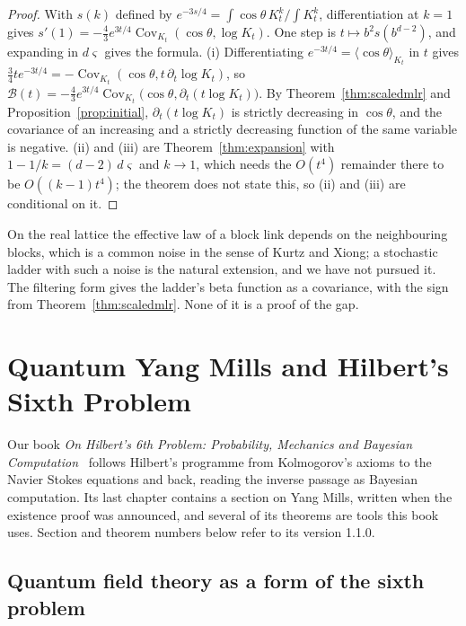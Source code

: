 \begin{proof}
With $s(k)$ defined by $e^{-3s/4}=\int\cos\theta\,K_t^k/\int K_t^k$, differentiation at $k=1$ gives $s'(1)=-\frac43e^{3t/4}\operatorname{Cov}_{K_t}(\cos\theta,\log K_t)$. One step is $t\mapsto b^2s(b^{d-2})$, and expanding in $d\varsigma$ gives the formula. (i) Differentiating $e^{-3t/4}=\langle\cos\theta\rangle_{K_t}$ in $t$ gives $\frac34te^{-3t/4}=-\operatorname{Cov}_{K_t}(\cos\theta,t\,\partial_t\log K_t)$, so $\mathcal B(t)=-\frac43e^{3t/4}\operatorname{Cov}_{K_t}\big(\cos\theta,\partial_t(t\log K_t)\big)$. By Theorem~\ref{thm:scaledmlr} and Proposition~\ref{prop:initial}, $\partial_t(t\log K_t)$ is strictly decreasing in $\cos\theta$, and the covariance of an increasing and a strictly decreasing function of the same variable is negative. (ii) and (iii) are Theorem~\ref{thm:expansion} with $1-1/k=(d-2)\,d\varsigma$ and $k\to1$, which needs the $O(t^4)$ remainder there to be $O((k-1)t^4)$; the theorem does not state this, so (ii) and (iii) are conditional on it.
\end{proof}

On the real lattice the effective law of a block link depends on the neighbouring blocks, which is a common noise in the sense of Kurtz and Xiong; a stochastic ladder with such a noise is the natural extension, and we have not pursued it. The filtering form gives the ladder's beta function as a covariance, with the sign from Theorem~\ref{thm:scaledmlr}. None of it is a proof of the gap.

\section{Quantum Yang Mills and Hilbert's Sixth Problem}\label{ch:h6ym}

Our book \emph{On Hilbert's 6th Problem: Probability, Mechanics and Bayesian Computation}~\cite{PS26h} follows Hilbert's programme from Kolmogorov's axioms to the Navier Stokes equations and back, reading the inverse passage as Bayesian computation. Its last chapter contains a section on Yang Mills, written when the existence proof was announced, and several of its theorems are tools this book uses. Section and theorem numbers below refer to its version 1.1.0.

\subsection{Quantum field theory as a form of the sixth problem}

